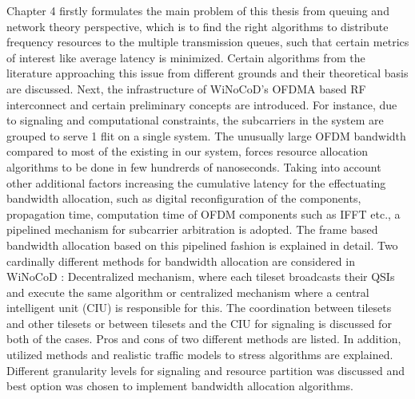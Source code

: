 Chapter 4 firstly formulates the main problem of this thesis from queuing and network theory perspective, which is to find the right algorithms to distribute frequency resources to the multiple transmission queues, such that certain metrics of interest like average latency is minimized. Certain algorithms from the literature approaching this issue from different grounds and their theoretical basis are discussed. Next, the infrastructure of WiNoCoD's OFDMA based RF interconnect and certain preliminary concepts are introduced. For instance, due to signaling and computational constraints, the subcarriers in the system are grouped to serve 1 flit on a single system. The unusually large OFDM bandwidth compared to most of the existing in our system, forces resource allocation algorithms to be done in few hundrerds of nanoseconds. Taking into account other additional factors increasing the cumulative latency for the effectuating bandwidth allocation, such as digital reconfiguration of the components, propagation time, computation time of OFDM components such as IFFT etc., a pipelined mechanism for subcarrier arbitration is adopted. The frame based bandwidth allocation based on this pipelined fashion is explained in detail. Two cardinally different methods for bandwidth allocation are considered in WiNoCoD : Decentralized mechanism, where each tileset broadcasts their QSIs and execute the same algorithm or centralized mechanism where a central intelligent unit (CIU) is responsible for this. The coordination between tilesets and other tilesets or between tilesets and the CIU for signaling is discussed for both of the cases. Pros and cons of two different methods are listed. In addition, utilized methods and realistic traffic models to stress algorithms are explained. Different granularity levels for signaling and resource partition was discussed and best option was chosen to implement bandwidth allocation algorithms.  

